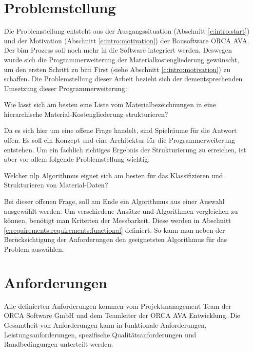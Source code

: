 \section{Problemstellung}
\label{c:requirements:problem}

Die Problemstellung entsteht aus der Ausgangssituation (Abschnitt \ref{c:intro:start}) und der Motivation (Abschnitt \ref{c:intro:motivation}) der Bausoftware ORCA AVA. Der \ac{bim} Prozess soll noch mehr in die Software integriert werden. Deswegen wurde sich die Programmerweiterung der Materialkostengliederung gewünscht, um den ersten Schritt zu \glqq \ac{bim} First\grqq{} (siehe Abschnitt \ref{c:intro:motivation}) zu schaffen. Die Problemstellung dieser Arbeit bezieht sich der dementsprechenden Umsetzung dieser Programmerweiterung:

\begin{problem}
	\label{p:main}
	Wie lässt sich am besten eine Liste vom Materialbezeichnungen in eine hierarchische Material-Kostengliederung strukturieren?
\end{problem}

Da es sich hier um eine offene Frage handelt, sind Spielräume für die Antwort offen. Es soll ein Konzept und eine Architektur für die Programmerweiterung entstehen. Um ein fachlich richtiges Ergebnis der Strukturierung zu erreichen, ist aber vor allem folgende Problemstellung wichtig:

\begin{problem}
	\label{p:algorithm}
	Welcher \ac{nlp} Algorithmus eignet sich am besten für das Klassifizieren und Strukturieren von Material-Daten? 
\end{problem}

Bei dieser offenen Frage, soll am Ende ein Algorithmus aus einer Auswahl ausgewählt werden.
Um verschiedene Ansätze und Algorithmen vergleichen zu können, benötigt man Kriterien der Messbarkeit. Diese werden in Abschnitt \ref{c:requirements:requirements:functional} definiert. So kann man neben der Berücksichtigung der Anforderungen den geeignetsten Algorithmus für das Problem auswählen.


\section{Anforderungen}
\label{c:requirements:requirements}
Alle definierten Anforderungen kommen vom Projektmanagement Team der ORCA Software GmbH und dem Teamleiter der ORCA AVA Entwicklung. Die Gesamtheit von Anforderungen kann in funktionale Anforderungen, Leistungsanforderungen, spezifische Qualitätsanforderungen und Randbedingungen unterteilt werden.\citep{glinz_2007}

